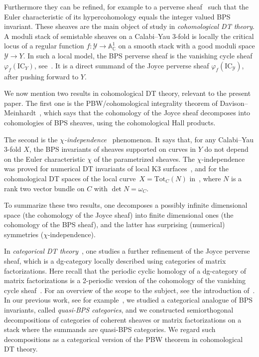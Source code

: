 \documentclass [11pt,oneside,a4paper,mathscr]{amsart}
\theoremstyle{definition}
\newcommand{\Y}{\mathcal{Y}}
\begin{document}
Furthermore they can be refined, for example to a perverse sheaf~\cite{Beh, MR2851153, BBJ, BBBJ} such that the Euler characteristic of its hypercohomology equals the integer valued BPS invariant. These sheaves are the main object of study in \textit{cohomological DT theory}. 
A moduli stack of semistable sheaves on a Calabi--Yau $3$-fold is locally the critical locus of a regular function $f\colon \Y\to\mathbb{A}^1_\mathbb{C}$ on a smooth stack with a good moduli space $\Y\to Y$. In such a local model, the BPS perverse sheaf is the vanishing cycle sheaf $\varphi_f(\text{IC}_Y)$, see~\cite{DM, BDIKP}. It is a direct summand of the Joyce perverse sheaf $\varphi_{f}(\text{IC}_{\Y})$, after pushing forward to $Y$. 

We now mention two results in cohomological DT theory, relevant to the present paper.
The first one is the PBW/cohomological integrality theorem of Davison--Meinhardt~\cite{DM, BDIKP}, which says that the cohomology of the Joyce sheaf decomposes into cohomologies of BPS sheaves, using the cohomological Hall products.  

The second is the \textit{$\chi$-independence}~\cite[Conjecture 1.2]{TodGV} phenomenon. It says that, for any Calabi--Yau $3$-fold $X$, the BPS invariants of sheaves supported on curves in $Y$ do not depend on the Euler characteristic $\chi$ of the parametrized sheaves. The $\chi$-independence was proved for numerical DT invariants of local K3 surfaces~\cite{MTK3}, and for the cohomological DT spaces of the local curve~$X=\text{Tot}_C(N)$ in~\cite{KinjoKoseki, DMJS}, where $N$ is a rank two vector bundle on 
$C$ with $\det N=\omega_C$.

To summarize these two results, one decomposes a possibly infinite dimensional space (the cohomology of the Joyce sheaf) into finite dimensional ones (the cohomology of the BPS sheaf), and the latter has surprising (numerical) symmetries ($\chi$-independence). 

\medskip

In \textit{categorical DT theory}~\cite{T, T4, HHR1, HHR2}, one studies a further refinement of the Joyce perverse sheaf, which is a dg-category locally described using categories of matrix factorizations. Here recall that the periodic cyclic homology of a dg-category of matrix factorizations is a 2-periodic version of the cohomology of the vanishing cycle sheaf~\cite{Eff, MR3877165}. For an overview of the scope to the subject, see the introduction of~\cite{T}. In our previous work, see for example~\cite{PTquiver, PTtop, PThiggs}, we studied a categorical analogue of BPS invariants, called \textit{quasi-BPS categories}, and we constructed semiorthogonal decompositions of categories of coherent sheaves or matrix factorizations on a stack where the summands are quasi-BPS categories.  We regard such decompositions as a categorical version of the PBW theorem in cohomological DT theory.
\end{document}
